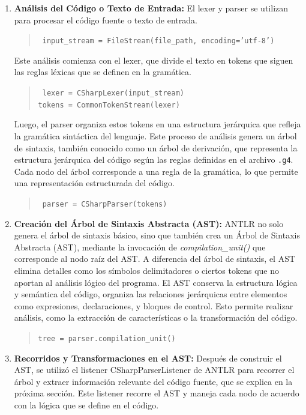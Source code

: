 \begin{enumerate}
Se utilizó ANTLR versión 4.13.2, que procesa los archivos \texttt{.g4} y genera las clases necesarias en Python. De igual forma, ANTLR automatiza el proceso de análisis léxico y sintáctico, facilitando la creación de herramientas como compiladores y analizadores de código.


    \item \textbf{Análisis del Código o Texto de Entrada:} El lexer y parser se utilizan para procesar el código fuente o texto de entrada. 
    
\begin{quote} \texttt{ input\_stream = FileStream(file\_path, encoding='utf-8')} \end{quote}
    
    Este análisis comienza con el lexer, que divide el texto en tokens que siguen las reglas léxicas que se definen en la gramática.

\begin{quote} \texttt{ lexer = CSharpLexer(input\_stream) \\ tokens = CommonTokenStream(lexer)} \end{quote}    
    
     Luego, el parser organiza estos tokens en una estructura jerárquica que refleja la gramática sintáctica del lenguaje. Este proceso de análisis genera un árbol de sintaxis, también conocido como un árbol de derivación, que representa la estructura jerárquica del código según las reglas definidas en el archivo \texttt{.g4}. Cada nodo del árbol corresponde a una regla de la gramática, lo que permite una representación estructurada del código.
      
\begin{quote} \texttt{ parser = CSharpParser(tokens)   } \end{quote}       

    \item \textbf{Creación del Árbol de Sintaxis Abstracta (AST):} ANTLR no solo genera el árbol de sintaxis básico, sino que también crea un Árbol de Sintaxis Abstracta (AST), mediante la invocación de \textit{compilation\_unit()} que corresponde al nodo raíz del AST. A diferencia del árbol de sintaxis, el AST elimina detalles como los símbolos delimitadores o ciertos tokens que no aportan al análisis lógico del programa. El AST conserva la estructura lógica y semántica del código, organiza las relaciones jerárquicas entre elementos como expresiones, declaraciones, y bloques de control. Esto permite realizar análisis, como la extracción de características o la transformación del código.

\begin{quote} \texttt{tree = parser.compilation\_unit()} \end{quote} 

\item \textbf{Recorridos y Transformaciones en el AST:} Después de construir el AST, se utilizó el listener CSharpParserListener de ANTLR para recorrer el árbol y extraer información relevante del código fuente, que se explica en la próxima sección. Este listener recorre el AST y maneja cada nodo de acuerdo con la lógica que se define en el código.
\end{enumerate}

